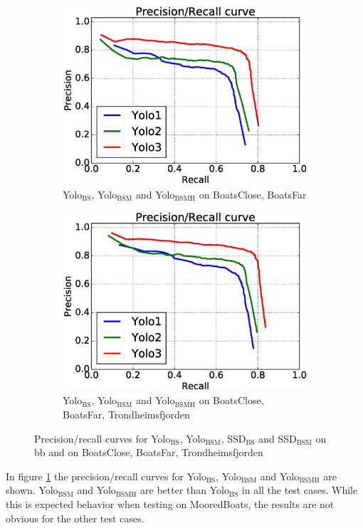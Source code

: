 \begin{figure}[h!]
\begin{subfigure}{.5\textwidth}
  \centering
  \includegraphics[width=0.8\linewidth]{results/case_tr_moor/prec_recall/bcbf.eps}
  \caption{Yolo$_{\text{BS}}$, Yolo$_{\text{BSM}}$ and Yolo$_{\text{BSMH}}$ on BoatsClose, BoatsFar}
\end{subfigure}%
\begin{subfigure}{.5\textwidth}
  \centering
  \includegraphics[width=.8\linewidth]{results/case_tr_moor/prec_recall/bcbftrf.eps}
  \caption{Yolo$_{\text{BS}}$, Yolo$_{\text{BSM}}$ and Yolo$_{\text{BSMH}}$  on BoatsClose, BoatsFar, Trondheimsfjorden}
\end{subfigure}
\caption{Precision/recall curves for Yolo$_{\text{BS}}$, Yolo$_{\text{BSM}}$, SSD$_{\text{BS}}$ and SSD$_{\text{BSM}}$ on bb and on BoatsClose, BoatsFar, Trondheimsfjorden}
\label{fig:prec_rec_case_moor}

\end{figure}

In figure \ref{fig:prec_rec_case_moor} the precision/recall curves for Yolo$_{\text{BS}}$, Yolo$_{\text{BSM}}$ and Yolo$_{\text{BSMH}}$ are shown. Yolo$_{\text{BSM}}$ and Yolo$_{\text{BSMH}}$ are better than Yolo$_{\text{BS}}$ in all the test cases. While this is expected behavior when testing on MooredBoats, the results are not obvious for the other test cases. 

